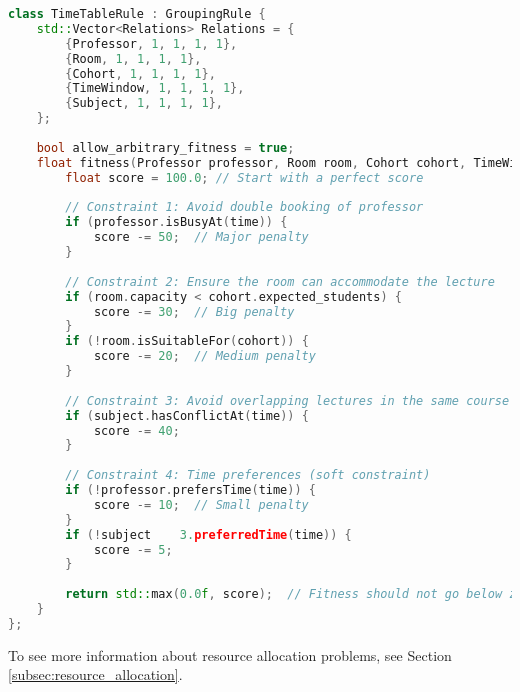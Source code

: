 \begin{lstlisting}[language=C++, caption={Creating and solving the Timetable Scheduling Problem using this framework.}, label={script:time_table}]
class TimeTableRule : GroupingRule {
    std::Vector<Relations> Relations = {
        {Professor, 1, 1, 1, 1},
        {Room, 1, 1, 1, 1},
        {Cohort, 1, 1, 1, 1},
        {TimeWindow, 1, 1, 1, 1},
        {Subject, 1, 1, 1, 1},
    };
    
    bool allow_arbitrary_fitness = true;
    float fitness(Professor professor, Room room, Cohort cohort, TimeWindow time, Subject subject){
        float score = 100.0; // Start with a perfect score
        
        // Constraint 1: Avoid double booking of professor
        if (professor.isBusyAt(time)) {
            score -= 50;  // Major penalty
        }
        
        // Constraint 2: Ensure the room can accommodate the lecture
        if (room.capacity < cohort.expected_students) {
            score -= 30;  // Big penalty
        }
        if (!room.isSuitableFor(cohort)) {
            score -= 20;  // Medium penalty
        }
        
        // Constraint 3: Avoid overlapping lectures in the same course
        if (subject.hasConflictAt(time)) {
            score -= 40;
        }
        
        // Constraint 4: Time preferences (soft constraint)
        if (!professor.prefersTime(time)) {
            score -= 10;  // Small penalty
        }
        if (!subject    3.preferredTime(time)) {
            score -= 5;
        }
        
        return std::max(0.0f, score);  // Fitness should not go below zero
    }
};
\end{lstlisting}

To see more information about resource allocation problems, see Section \ref{subsec:resource_allocation}.

            
    
